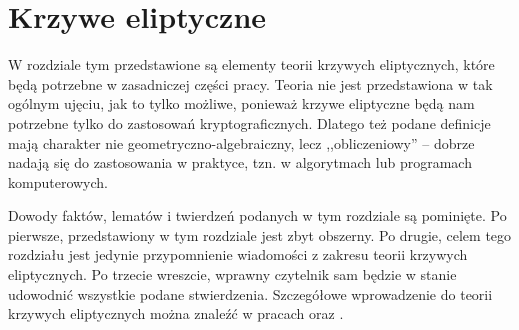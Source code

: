 \chapter{Krzywe eliptyczne}

W rozdziale tym przedstawione są elementy teorii krzywych eliptycznych,
które będą potrzebne w zasadniczej części pracy.
Teoria nie jest przedstawiona w tak ogólnym ujęciu, jak to tylko możliwe,
ponieważ krzywe eliptyczne będą nam potrzebne
tylko do zastosowań kryptograficznych.
Dlatego też podane definicje mają charakter
nie geometryczno-algebraiczny, lecz ,,obliczeniowy'' --
dobrze nadają się do zastosowania w praktyce,
tzn. w algorytmach lub programach komputerowych.

Dowody faktów, lematów i twierdzeń podanych w tym rozdziale są pominięte.
Po pierwsze, przedstawiony w tym rozdziale jest zbyt obszerny.
Po drugie, celem tego rozdziału jest jedynie przypomnienie wiadomości
z zakresu teorii krzywych eliptycznych.
Po trzecie wreszcie, wprawny czytelnik sam będzie w stanie
udowodnić wszystkie podane stwierdzenia.
Szczegółowe wprowadzenie do teorii krzywych eliptycznych
można znaleźć w pracach \cite{ecintro1} oraz \cite{ecintro2}.








